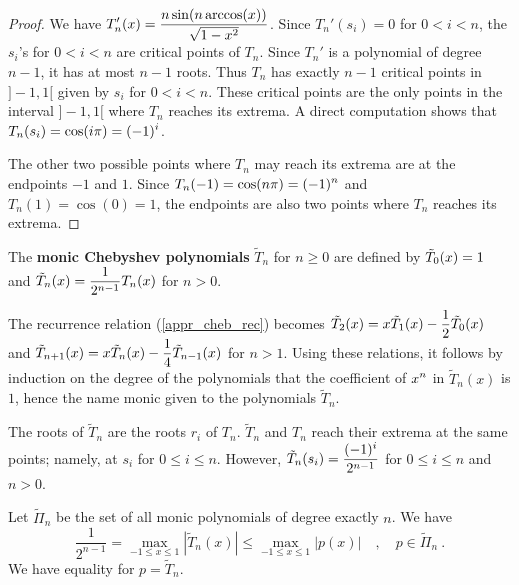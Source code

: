 \begin{proof}
We have $\displaystyle T_n'(x) = \frac{n\sin(n\arccos(x))}{\sqrt{1-x^2}}$.
Since $T_n'(s_i) = 0$ for $0<i<n$, the $s_i$'s for $0<i<n$ are critical
points of $T_n$.  Since $T_n'$ is a polynomial of degree $n-1$, it has at
most $n-1$ roots.  Thus $T_n$ has exactly $n-1$ critical points in $]-1,1[$
given by $s_i$ for $0<i<n$.  These critical points are the only points in the
interval $]-1,1[$ where $T_n$ reaches its extrema.  A direct computation
shows that $\displaystyle T_n(s_i) = \cos(i\pi) = (-1)^i$.

The other two possible points where $T_n$ may reach its extrema are at the
endpoints $-1$ and $1$.  Since $\displaystyle T_n(-1) = \cos(n\pi) = (-1)^n$ and
$T_n(1) = \cos(0) = 1$, the endpoints are also two points where $T_n$
reaches its extrema.
\end{proof}

\begin{defn}
The {\bfseries monic Chebyshev polynomials} $\tilde{T}_n$ for $n\geq 0$ are 
defined by $\displaystyle \tilde{T}_0(x) = 1$ and
$\displaystyle \tilde{T}_n(x) = \frac{1}{2^{n-1}} T_n(x)$ for $n >0$.
\end{defn}

\begin{rmk}
The recurrence relation (\ref{appr_cheb_rec}) becomes
$\displaystyle \tilde{T}_2(x) = x \tilde{T}_1(x) - \frac{1}{2} \tilde{T}_0(x)$
and
$\displaystyle \tilde{T}_{n+1}(x) = x \tilde{T}_n(x) - \frac{1}{4}
\tilde{T}_{n-1}(x)$ for $n>1$.  Using these relations, it follows by
induction on the degree of the polynomials that the coefficient of
$\displaystyle x^n$ in $\tilde{T}_n(x)$ is $1$, hence the name monic
given to the polynomials $\tilde{T}_n$.

The roots of $\tilde{T}_n$ are the roots $r_i$ of $T_n$.
$\tilde{T}_n$ and $T_n$ reach their extrema at the same points;
namely, at $s_i$ for $0\leq i \leq n$.  However,
$\displaystyle \tilde{T}_n(s_i) = \frac{(-1)^i}{2^{n-1}}$ for
$0\leq i \leq n$ and $n>0$.
\end{rmk}

\begin{prop}
Let $\tilde{\Pi}_n$ be the set of all monic polynomials of degree exactly
$n$.  We have
\[
\frac{1}{2^{n-1}} = \max_{-1\leq x \leq 1} \left| \tilde{T}_n(x)\right| \leq
\max_{-1\leq x \leq 1} \left| p(x) \right| \quad , \quad p \in \tilde{\Pi}_n
\ .
\]
We have equality for $p = \tilde{T}_n$.
\label{appr_nCheb_max}
\end{prop}

